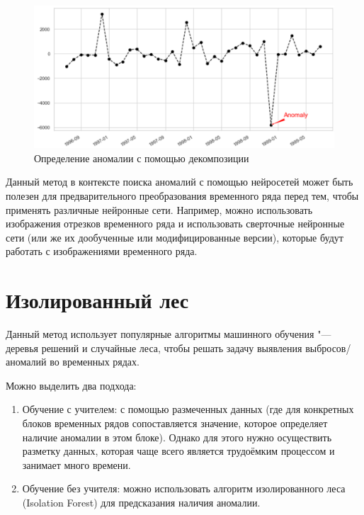 \documentclass[bachelor, och, referat]{../shiza}
\begin{document}
        \begin{figure}[H]
            \centering
            \includegraphics[width=1\textwidth]{pic/stlanom.png}
            \caption{Определение аномалии с помощью декомпозиции}
        \end{figure}

        Данный метод в контексте поиска аномалий с помощью нейросетей может быть
        полезен для предварительного преобразования временного ряда перед тем,
        чтобы применять различные нейронные сети. Например, можно использовать
        изображения отрезков временного ряда и использовать сверточные нейронные
        сети (или же их дообученные или модифицированные версии), которые будут
        работать с изображениями временного ряда.

\section{Изолированный лес}
    
        Данный метод использует популярные алгоритмы машинного обучения "---
        деревья решений и случайные леса, чтобы решать задачу выявления
        выбросов/аномалий во временных рядах.
        
        
        Можно выделить два подхода:
        \begin{enumerate}
            \item Обучение с учителем: с помощью размеченных данных (где для
            конкретных блоков временных рядов сопоставляется значение, которое
            определяет наличие аномалии в этом блоке). Однако для этого нужно
            осуществить разметку данных, которая чаще всего является трудоёмким
            процессом и занимает много времени.
            \item Обучение без учителя: можно использовать алгоритм
            изолированного леса (Isolation Forest) для предсказания наличия
            аномалии.
        \end{enumerate}
        
\end{document}
